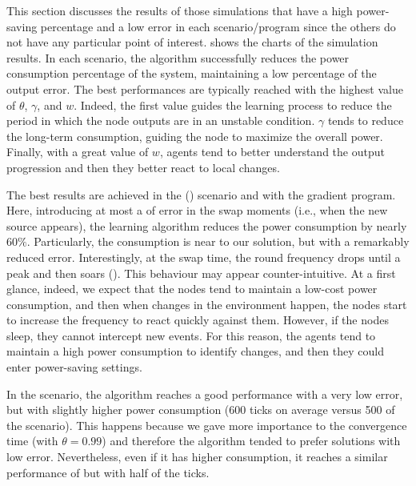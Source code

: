 This section discusses the results of 
 those simulations that have a high power-saving percentage
 and a low error in each scenario/program
 since the others do not have any particular point of interest. 
%
 shows the charts of the simulation results.
%
In each scenario, the algorithm successfully 
 reduces the power consumption percentage of the system, 
 maintaining a low percentage of the output error. 
%
 The best performances are typically reached with the highest value of $\theta$, $\gamma$, and $w$.
%
Indeed, the first value guides the learning process 
 to reduce the period in which the node outputs are in an unstable condition. 
%
$\gamma$ tends to reduce the long-term consumption, 
 guiding the node to maximize the overall power.
% 
Finally, with a great value of $w$, 
 agents tend to better understand the output progression and then they better react to local changes. 

The best results are achieved in the \swapscen{} ()
 scenario and with the gradient program. 
 Here, introducing at most a  of error in the swap moments 
 (i.e., when the new source appears), 
 the learning algorithm reduces the power consumption by nearly 60$\%$.
%
Particularly, the consumption is near to our \adhocsol{} solution, 
 but with a remarkably reduced error. 
%
Interestingly, at the swap time, the round frequency drops until a peak and then soars ().
This behaviour may appear counter-intuitive.
 At a first glance, indeed, we expect that the nodes tend to maintain a low-cost power consumption, 
 and then when changes in the environment happen, 
 the nodes start to increase the frequency to react quickly against them.
%
However, if the nodes sleep, they cannot intercept new events. 
 For this reason, the agents tend to maintain a high power 
 consumption to identify changes, and then they could enter power-saving settings.%

In the \multiswap{} scenario, 
 the algorithm reaches a good performance with a very low error, 
 but with slightly higher power consumption (600 ticks on average versus 500 of the \swapscen{} scenario). 
%
This happens because we gave more importance to the convergence time 
 (with $\theta = 0.99$) and therefore the algorithm tended 
 to prefer solutions with low error. 
%
Nevertheless, even if it has higher consumption, 
 it reaches a similar performance of \periodicsol{} but with half of the ticks.
%


